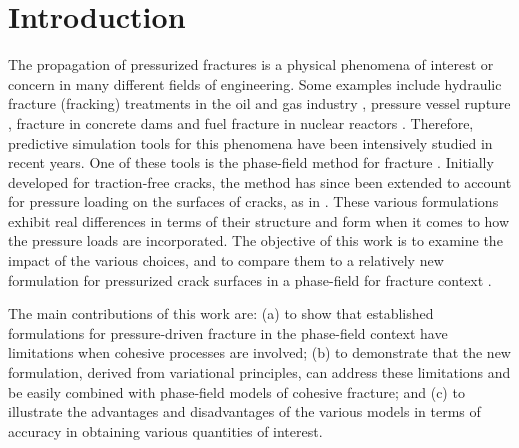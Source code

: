 \section{Introduction}
\label{sec:introduction}

The propagation of pressurized fractures is a physical phenomena of interest or concern in many different fields of engineering. Some examples include hydraulic fracture (fracking) treatments in the oil and gas industry \cite{li2015review, mair2012shale}, pressure vessel rupture \cite{shinmura1997fluid}, fracture in concrete dams \cite{wang2017experimental} and fuel fracture in nuclear reactors \cite{capps2021critical, turnbull2015assessment}. Therefore, predictive simulation tools for this phenomena have been intensively studied in recent years. One of these tools is the phase-field method for fracture \cite{bourdin2000numerical}. Initially developed for traction-free cracks, the method has since been extended to account for pressure loading on the surfaces of cracks, as in \cite{bourdin2012variational, wheeler2014augmented, mikelic2015quasi, peco2017influence, jiang2022phase}.  These various formulations exhibit real differences in terms of their structure and form when it comes to how the pressure loads are incorporated. The objective of this work is to examine the impact of the various choices, and to compare them to 
a relatively new formulation for pressurized crack surfaces in a phase-field for fracture context \cite{hu2021variationalthesis}.  

The main contributions of this work are: (a) to show that established formulations for pressure-driven fracture in the phase-field
context have limitations when cohesive processes are involved; (b) to demonstrate that the new formulation, derived from variational principles, can address these limitations and be easily combined with phase-field models of cohesive fracture; and (c) to illustrate the advantages and disadvantages of the various models in terms of accuracy in obtaining various quantities of interest.  

